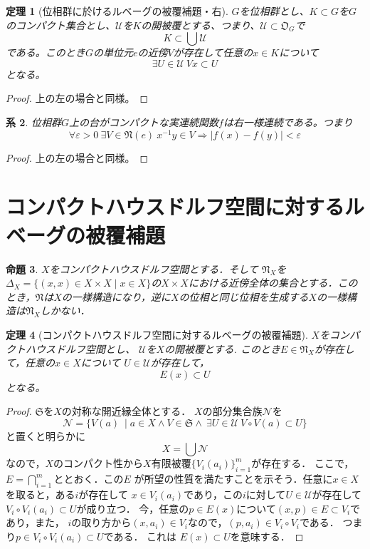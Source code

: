 \documentclass[leqno]{jsarticle}
\newtheorem{thm}{定理}
\newtheorem{prop}[thm]{命題}
\newtheorem{cor}[thm]{系}
\newcommand{\To}{\Longrightarrow}
\newcommand{\ep}{\varepsilon}
\begin{document}
\begin{thm}[位相群に於けるルベーグの被覆補題・右]
$G$を位相群とし、$K\subset G$を$G$のコンパクト集合とし、$\mathcal{U}$を$K$の開被覆とする、つまり、$\mathcal{U}\subset \mathfrak{O}_{G}$で
\[
K\subset \bigcup \mathcal{U}
\]
である。このとき$G$の単位元$e$の近傍$V$が存在して任意の$x\in K$について
\[
\exists U\in \mathcal{U}\ Vx\subset U
\]
となる。
\end{thm}
\begin{proof}
上の左の場合と同様。
\end{proof}

\begin{cor}
位相群$G$上の台がコンパクトな実連続関数$f$は右一様連続である。つまり
\[
\forall \ep >0\ \exists V\in \mathfrak{N}(e)\ x^{-1}y\in V \To |f(x)-f(y)|<\ep
\]
\end{cor}
\begin{proof}
上の左の場合と同様。
\end{proof}



\section{コンパクトハウスドルフ空間に対するルベーグの被覆補題}

\begin{prop}
$X$をコンパクトハウスドルフ空間とする．そして
$\mathfrak{N}_X$を$\Delta_X=\{(x, x)\in X\times X\mid x\in X\}$の$X\times X$における近傍全体の集合とする．このとき，$\mathfrak{N}$は$X$の一様構造になり，逆に$X$の位相と同じ位相を生成する$X$の一様構造は$\mathfrak{N}_X$しかない．
\end{prop}

\begin{thm}[コンパクトハウスドルフ空間に対するルベーグの被覆補題]
$X$をコンパクトハウスドルフ空間とし、
$\mathcal{U}$を$X$の開被覆とする.
このとき$E\in \mathfrak{N}_X$が存在して，任意の$x\in X$について
$U\in \mathcal{U}$が存在して，
\[
E(x)\subset U
\]
となる。

\end{thm}
\begin{proof}
$\mathfrak{S}$を$X$の対称な開近縁全体とする．
$X$の部分集合族$\mathcal{N}$を
\[
\mathcal{N}=\{V(a)\ \mid a\in X\land V\in \mathfrak{S}\land  \ \exists U\in \mathcal{U}\ V\circ V(a)\subset U\}
\]
と置くと明らかに
\[
X= \bigcup \mathcal{N}
\]
なので，$X$のコンパクト性から$X$有限被覆$\{V_i(a_i)\}_{i=1}^m$が存在する．
ここで，$E=\bigcap_{i=1}^m$ととおく．この$E$
が所望の性質を満たすことを示そう．任意に$x\in X$を取ると，ある$i$が存在して
$x\in V_i(a_i)$であり，この$i$に対して$U\in \mathcal{U}$が存在して
$V_i\circ V_i(a_i)\subset U$が成り立つ．
今，任意の$p\in E(x)$について$(x, p)\in E\subset V_i$であり，また，
$i$の取り方から$(x, a_i)\in V_i$なので，$(p, a_i)\in V_i\circ V_i$である．
つまり$p\in V_i\circ V_i(a_i)\subset U$である．
これは
$E(x)\subset U$を意味する．
\end{proof}
\end{document}
